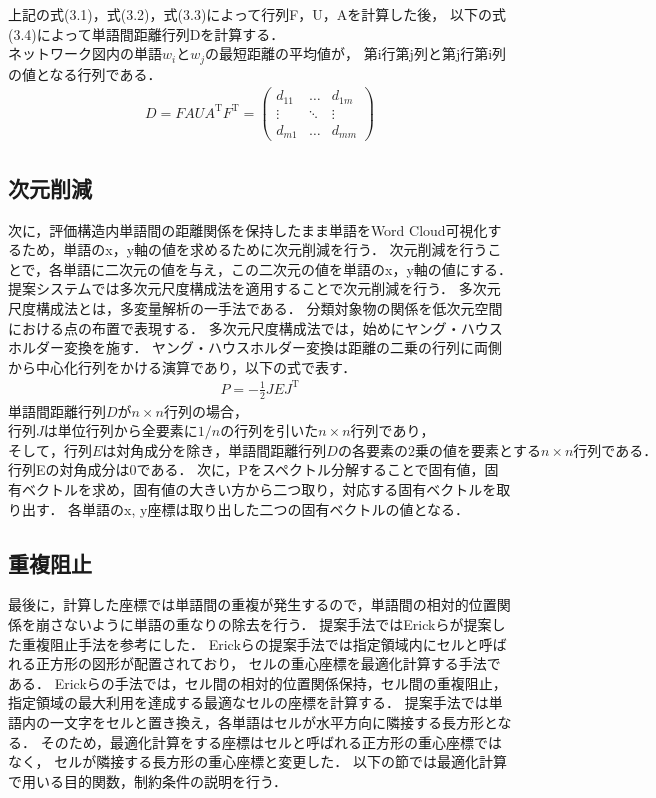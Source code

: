 \documentclass[syuuron]{kuee}
\begin{document}
			上記の式(3.1)，式(3.2)，式(3.3)によって行列F，U，Aを計算した後，
			以下の式(3.4)によって単語間距離行列Dを計算する．
			$ネットワーク図内の単語w_iとw_jの最短距離の平均値が，$
			第i行第j列と第j行第i列の値となる行列である．
			\begin{eqnarray}
			 D = FAUA^{\mathrm{T}}F^{\mathrm{T}}
			   = \left(
			    \begin{array}{cccc}
			    	d_{11} & \ldots & d_{1m} \\
			    	\vdots & \ddots & \vdots \\
			    	d_{m1} & \ldots & d_{mm}
				\end{array}
			 \right)
			\end{eqnarray}	
			
		\subsection{次元削減}
			次に，評価構造内単語間の距離関係を保持したまま単語をWord Cloud可視化するため，単語のx，y軸の値を求めるために次元削減を行う．
			次元削減を行うことで，各単語に二次元の値を与え，この二次元の値を単語のx，y軸の値にする．
			提案システムでは多次元尺度構成法を適用することで次元削減を行う．
			多次元尺度構成法とは，多変量解析の一手法である． 分類対象物の関係を低次元空間における点の布置で表現する．
			多次元尺度構成法では，始めにヤング・ハウスホルダー変換を施す．
			ヤング・ハウスホルダー変換は距離の二乗の行列に両側から中心化行列をかける演算であり，以下の式で表す．
			\begin{eqnarray}
				P = - \frac{1}{2} JEJ^{\mathrm{T}}
			\end{eqnarray}
			$単語間距離行列Dがn \times n行列の場合，$
			$行列Jは単位行列から全要素に1/nの行列を引いたn \times n行列であり，$
			$そして，行列Eは対角成分を除き，単語間距離行列Dの各要素の2乗の値を要素とするn \times n行列である．$
			行列Eの対角成分は0である．
			次に，Pをスペクトル分解することで固有値，固有ベクトルを求め，固有値の大きい方から二つ取り，対応する固有ベクトルを取り出す．
			各単語のx, y座標は取り出した二つの固有ベクトルの値となる．
			
		\subsection{重複阻止}
			最後に，計算した座標では単語間の重複が発生するので，単語間の相対的位置関係を崩さないように単語の重なりの除去を行う．
			提案手法ではErickらが提案した重複阻止手法を参考にした\cite{or2}．
			Erickらの提案手法では指定領域内にセルと呼ばれる正方形の図形が配置されており，
			セルの重心座標を最適化計算する手法である．
			Erickらの手法では，セル間の相対的位置関係保持，セル間の重複阻止，指定領域の最大利用を達成する最適なセルの座標を計算する．
			提案手法では単語内の一文字をセルと置き換え，各単語はセルが水平方向に隣接する長方形となる．
			そのため，最適化計算をする座標はセルと呼ばれる正方形の重心座標ではなく，
			セルが隣接する長方形の重心座標と変更した．
			以下の節では最適化計算で用いる目的関数，制約条件の説明を行う．
			
\end{document}
